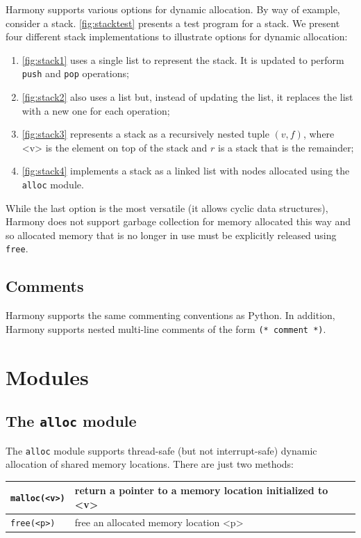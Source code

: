 \documentclass{report}
\begin{document}
Harmony supports various options for dynamic allocation.
By way of example, consider a stack.
\autoref{fig:stacktest} presents a test program for a stack.
We present four different stack implementations to illustrate
options for dynamic allocation:
\begin{enumerate}
\item[] \autoref{fig:stack1} uses a single list to represent the
stack.  It is updated to perform \texttt{push} and \texttt{pop} operations;
\item[] \autoref{fig:stack2} also uses a list but, instead of updating
the list, it replaces the list with a new one for each operation;
\item[] \autoref{fig:stack3} represents a stack as a recursively nested tuple
$(v, f)$, where <{v}> is the element on top of the stack and $r$ is a stack
that is the remainder;
\item[] \autoref{fig:stack4} implements a stack as a linked list with nodes
allocated using the \texttt{alloc} module.
\end{enumerate}

While the last option is the most versatile (it allows cyclic
data structures), Harmony does not support garbage collection
for memory allocated this way and so allocated memory that is no
longer in use must be explicitly released using \texttt{free}.

\section{Comments}

Harmony supports the same commenting conventions as Python.
In addition, Harmony supports nested multi-line comments
of the form \texttt{(* comment *)}.

\chapter{Modules}
\label{ap:module}

\section{The \texttt{alloc} module}

The \texttt{alloc} module
%
supports thread-safe (but not interrupt-safe) dynamic allocation of
shared memory locations.  There are just two methods:

\vspace{1em}
\begin{tabular}{|l|l|}
\hline
\texttt{malloc(<{v}>)} & return a pointer to a memory location initialized to <{v}> \\
\hline
\texttt{free(<{p}>)} & free an allocated memory location <{p}> \\
\hline
\end{tabular}
\vspace{1em}
\end{document}
